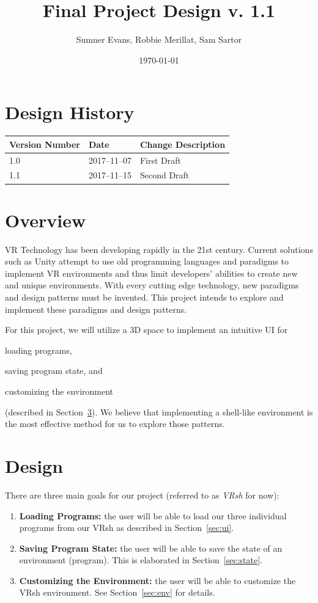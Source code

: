 \documentclass[titlepage,12pt]{article}
\title{Final Project Design v. 1.1}
\author{Sumner Evans, Robbie Merillat, Sam Sartor}
\date{\today}
\newcommand\name{VRsh}
\begin{document}
\maketitle

\section{Design History}
\begin{tabularx}{\linewidth}{| l | l || X |}
    \hline
    \textbf{Version Number} & \textbf{Date} & \textbf{Change Description} \\
    \hline\hline
    1.0 & 2017--11--07 & First Draft \\
    \hline
    1.1 & 2017--11--15 & Second Draft \\
    \hline
\end{tabularx}

\section{Overview}
VR Technology has been developing rapidly in the 21st century. Current solutions
such as Unity attempt to use old programming languages and paradigms to
implement VR environments and thus limit developers' abilities to create new and
unique environments. With every cutting edge technology, new paradigms and
design patterns must be invented. This project intends to explore and implement
these paradigms and design patterns.

For this project, we will utilize a 3D space to implement an intuitive UI for
\begin{enumerate*}[label={(\alph*)}]
    \item loading programs,
    \item saving program state, and
    \item customizing the environment
\end{enumerate*} (described in Section~\ref{sec:design}).  We believe that
implementing a shell-like environment is the most effective method for us to
explore those patterns.

\section{Design}\label{sec:design}
There are three main goals for our project (referred to as \textit{\name} for
now):
\begin{enumerate}
    \item \textbf{Loading Programs:} the user will be able to load our three
        individual programs from our {\name} as described in Section~\ref{sec:ui}.
    \item \textbf{Saving Program State:} the user will be able to save the state
        of an environment (program). This is elaborated in
        Section~\ref{sec:state}.
    \item \textbf{Customizing the Environment:} the user will be able to
        customize the {\name} environment. See Section~\ref{sec:env} for details.
\end{enumerate}
\end{document}

